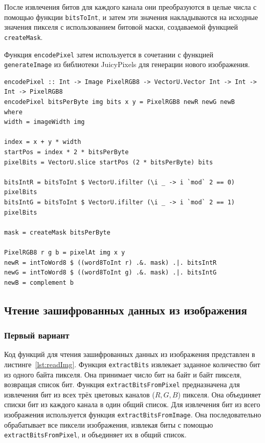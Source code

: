 \documentclass[11pt,a4paper,final]{article} %
\begin{document}
После извлечения битов для каждого канала они преобразуются в целые числа с помощью функции \texttt{bitsToInt}, и затем эти значения накладываются на исходные значения пикселя с использованием битовой маски, создаваемой функцией \texttt{createMask}.

Функция \texttt{encodePixel} затем используется в сочетании с функцией \texttt{generateImage} из библиотеки JuicyPixels для генерации нового изображения.

\begin{lstlisting}[caption={Второй вариант функции сохранения зашифрованных данных в изображение}, label={lst:genImg2}]
encodePixel :: Int -> Image PixelRGB8 -> VectorU.Vector Int -> Int -> Int -> PixelRGB8
encodePixel bitsPerByte img bits x y = PixelRGB8 newR newG newB
where
width = imageWidth img

index = x + y * width
startPos = index * 2 * bitsPerByte
pixelBits = VectorU.slice startPos (2 * bitsPerByte) bits

bitsIntR = bitsToInt $ VectorU.ifilter (\i _ -> i `mod` 2 == 0) pixelBits
bitsIntG = bitsToInt $ VectorU.ifilter (\i _ -> i `mod` 2 == 1) pixelBits

mask = createMask bitsPerByte

PixelRGB8 r g b = pixelAt img x y
newR = intToWord8 $ ((word8ToInt r) .&. mask) .|. bitsIntR
newG = intToWord8 $ ((word8ToInt g) .&. mask) .|. bitsIntG
newB = complement b
\end{lstlisting}


\subsection{Чтение зашифрованных данных из изображения}

\subsubsection{Первый вариант}

Код функций для чтения зашифрованных данных из изображения представлен в листинге~\ref{lst:readImg}. Функция \texttt{extractBits} извлекает заданное количество бит из одного байта пикселя. Она принимает число бит на байт и байт пикселя, возвращая список бит. Функция \texttt{extractBitsFromPixel} предназначена для извлечения бит из всех трёх цветовых каналов (\(R, G, B\)) пикселя. Она объединяет списки бит из каждого канала в один общий список. Для извлечения бит из всего изображения используется функция \texttt{extractBitsFromImage}. Она последовательно обрабатывает все пиксели изображения, извлекая биты с помощью \texttt{extractBitsFromPixel}, и объединяет их в общий список.
\end{document}
